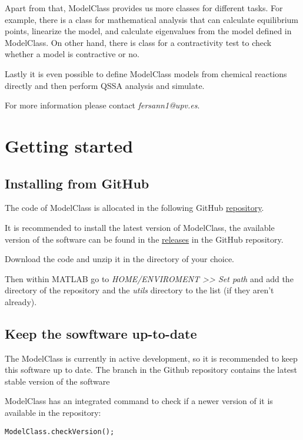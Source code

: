 \documentclass[11pt]{article}
\begin{document}
Apart from that, ModelClass provides us more classes for different tasks. For example, there is a class for mathematical analysis that can calculate equilibrium points, linearize the model, and calculate eigenvalues from the model defined in ModelClass. On other hand, there is class for a contractivity test to check whether a model is contractive or no.

Lastly it is even possible to define ModelClass models from chemical reactions directly and then perform QSSA analysis and simulate.

For more information please contact \textit{fersann1@upv.es}.

\section{Getting started}

\subsection{Installing from GitHub}

The code of ModelClass is allocated in the following GitHub \href{https://github.com/sb2cl/ModelClass}{repository}.

It is recommended to install the latest version of ModelClass, the available version of the software can be found in the \href{https://github.com/sb2cl/ModelClass/releases}{releases} in the GitHub repository.

Download the code and unzip it in the directory of your choice.

Then within MATLAB go to \textit{HOME/ENVIROMENT >> Set path} and add the directory of the repository and the \textit{utils} directory to the list (if they aren't already).

\subsection{Keep the sowftware up-to-date}

The ModelClass is currently in active development, so it is recommended to keep this software up to date. The  branch in the Github repository contains the latest stable version of the software

ModelClass has an integrated command to check if a newer version of it is available in the repository:
\begin{lstlisting}
ModelClass.checkVersion();
\end{lstlisting}
\end{document}

